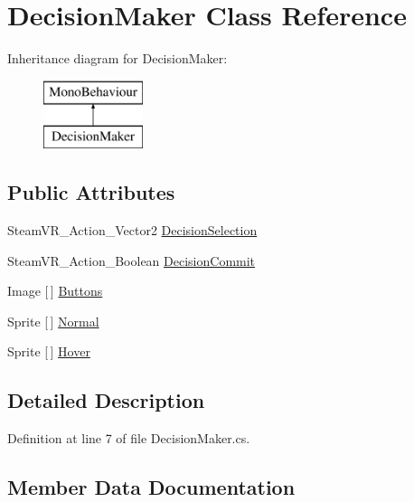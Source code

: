 \hypertarget{class_decision_maker}{}\section{Decision\+Maker Class Reference}
\label{class_decision_maker}
Inheritance diagram for Decision\+Maker\+:\begin{figure}[H]
\begin{center}
\leavevmode
\includegraphics[height=2.000000cm]{class_decision_maker}
\end{center}
\end{figure}
\subsection*{Public Attributes}
\begin{DoxyCompactItemize}
\item 
Steam\+V\+R\+\_\+\+Action\+\_\+\+Vector2 \mbox{\hyperlink{class_decision_maker_ab4e8b64116e631733740e6c872ca34d2}{Decision\+Selection}}
\item 
Steam\+V\+R\+\_\+\+Action\+\_\+\+Boolean \mbox{\hyperlink{class_decision_maker_adf1e2a6e9420d716bcd9cd87a982fdef}{Decision\+Commit}}
\item 
Image \mbox{[}$\,$\mbox{]} \mbox{\hyperlink{class_decision_maker_a7245a8dc72a9c5a90f804c7495b5cc16}{Buttons}}
\item 
Sprite \mbox{[}$\,$\mbox{]} \mbox{\hyperlink{class_decision_maker_ad5083f304d1a00f98982ef9154123fd9}{Normal}}
\item 
Sprite \mbox{[}$\,$\mbox{]} \mbox{\hyperlink{class_decision_maker_a326799f4e5c3e22f67b94e3db746c693}{Hover}}
\end{DoxyCompactItemize}


\subsection{Detailed Description}


Definition at line 7 of file Decision\+Maker.\+cs.



\subsection{Member Data Documentation}
\mbox{\label{class_decision_maker_a7245a8dc72a9c5a90f804c7495b5cc16}} 
